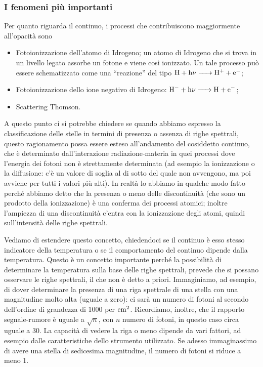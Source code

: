 \subsubsection{I fenomeni più importanti}

Per quanto riguarda il continuo, i processi che contribuiscono maggiormente all'opacità sono

\begin{itemize}
  \item Fotoionizzazione dell'atomo di Idrogeno; un atomo di Idrogeno che si trova in un livello legato assorbe un fotone e viene così ionizzato. Un tale processo può essere schematizzato come una “reazione” del tipo $\rm H + h \nu \ce{->} H^+ + e^-$;
  \item Fotoionizzazione dello ione negativo di Idrogeno: $\rm H^- + h \nu \ce{->} H + e^-$;
  \item Scattering Thomson.
\end{itemize}

A questo punto ci si potrebbe chiedere se quando abbiamo espresso la classificazione delle stelle in termini di presenza o assenza di righe spettrali, questo ragionamento possa essere esteso all'andamento del cosiddetto continuo, che è determinato dall'interazione radiazione-materia in quei processi dove l'energia dei fotoni non è strettamente determinata (ad esempio la ionizzazione o la diffusione: c'è un valore di soglia al di sotto del quale non avvengono, ma poi avviene per tutti i valori più alti). In realtà lo abbiamo in qualche modo fatto perché abbiamo detto che la presenza o meno delle discontinuità (che sono un prodotto della ionizzazione) è una conferma dei processi atomici; inoltre l'ampiezza di una discontinuità c'entra con la ionizzazione degli atomi, quindi sull'intensità delle righe spettrali.

Vediamo di estendere questo concetto, chiedendoci se il continuo è esso stesso indicatore della temperatura o se il comportamento del continuo dipende dalla temperatura. Questo è un concetto importante perché la possibilità di determinare la temperatura sulla base delle righe spettrali, prevede che si possano osservare le righe spettrali, il che non è detto a priori. Immaginiamo, ad esempio, di dover determinare la presenza di una riga spettrale di una stella con una magnitudine molto alta (uguale a zero): ci sarà un numero di fotoni al secondo dell'ordine di grandezza di 1000 per $\rm cm^2$. Ricordiamo, inoltre, che il rapporto segnale-rumore è uguale a $\sqrt{n}$, con $n$ numero di fotoni, in questo caso circa uguale a 30. La capacità di vedere la riga o meno dipende da vari fattori, ad esempio dalle caratteristiche dello strumento utilizzato. Se adesso immaginassimo di avere una stella di sedicesima magnitudine, il numero di fotoni si riduce a meno 1.

